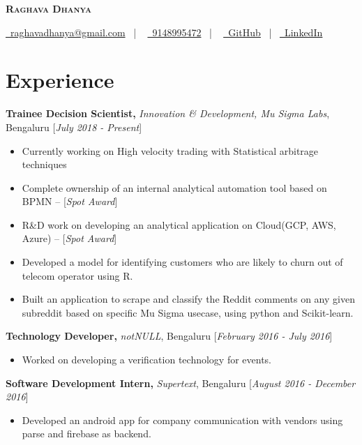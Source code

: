 \documentclass[10pt]{article}
\renewcommand{\textbf}[1]{{\bfseries\color{accent_darkest}#1}}
\begin{document}
\thispagestyle{empty}


\begin{center}
 \textbf{\textsc{\color{anotherred}\Huge Raghava Dhanya}}\\[10pt] %
\end{center}

\begin{center}
 \href{mailto:raghavadhanya@gmail.com}{\faEnvelope\ raghavadhanya@gmail.com}
 \ | \ %
 \href{tel:9148995472}{\faPhoneSquare\ 9148995472} \ | \ %
 \href{https://github.com/RaghavaDhanya}{ \underline{\faGithubSquare\
 GitHub}} \ | \ \href{https://in.linkedin.com/in/raghavadhanya}{\underline
 {\faLinkedinSquare\ LinkedIn}} 
\end{center}


\section*{Experience} 
\textbf{Trainee Decision Scientist,} \textit{Innovation \& Development, Mu Sigma Labs},
 Bengaluru \hfill \textcolor{grey_darker}{[\textit{July 2018 - Present}]}
\begin{itemize}
    \itemsep0em
    \item Currently working on High velocity trading with Statistical arbitrage techniques 
    \item Complete ownership of an internal analytical automation tool based on BPMN  -- [\textit{Spot Award}] 
    \item R\&D work on developing an analytical application on Cloud(GCP, AWS, Azure) -- [\textit{Spot Award}]
    \item Developed a model for identifying customers who are likely to churn out of telecom operator using R.
    \item Built an application to scrape and classify the Reddit comments on any given subreddit based
    on specific Mu Sigma usecase, using python and Scikit-learn.
\end{itemize}
\textbf{Technology Developer,} \textit{notNULL},
Bengaluru \hfill \textcolor{grey_darker}{[\textit{February 2016 - July 2016}]}
\begin{itemize}
    \itemsep0em
    \item Worked on developing a verification technology for events.
\end{itemize}
\medskip
\textbf{Software Development Intern,} \textit{Supertext}, Bengaluru
\hfill \textcolor{grey_darker}{[\textit{August 2016 - December 2016}]}
\begin{itemize}
    \item Developed an android app for company communication with vendors using
    parse and firebase as backend.     
\end{itemize}
\end{document}
